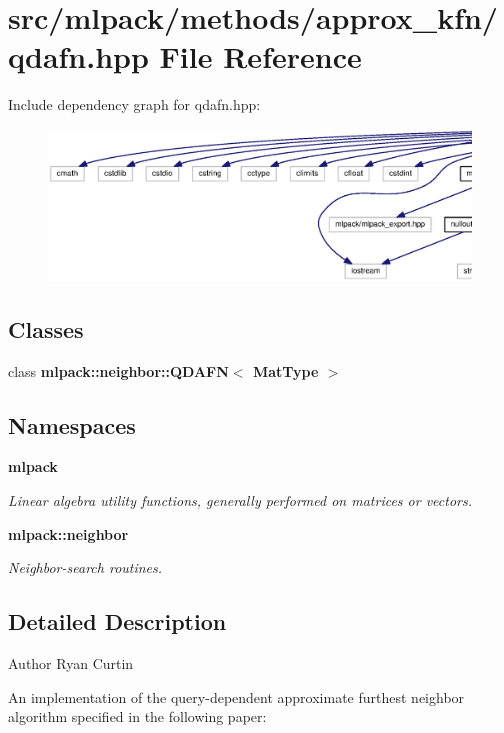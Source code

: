 \section{src/mlpack/methods/approx\+\_\+kfn/qdafn.hpp File Reference}
\label{qdafn_8hpp}
Include dependency graph for qdafn.\+hpp\+:
\nopagebreak
\begin{figure}[H]
\begin{center}
\leavevmode
\includegraphics[width=350pt]{qdafn_8hpp__incl}
\end{center}
\end{figure}
\subsection*{Classes}
\begin{DoxyCompactItemize}
\item 
class {\bf mlpack\+::neighbor\+::\+Q\+D\+A\+F\+N$<$ Mat\+Type $>$}
\end{DoxyCompactItemize}
\subsection*{Namespaces}
\begin{DoxyCompactItemize}
\item 
 {\bf mlpack}
\begin{DoxyCompactList}\small\item\em Linear algebra utility functions, generally performed on matrices or vectors. \end{DoxyCompactList}\item 
 {\bf mlpack\+::neighbor}
\begin{DoxyCompactList}\small\item\em Neighbor-\/search routines. \end{DoxyCompactList}\end{DoxyCompactItemize}


\subsection{Detailed Description}
\begin{DoxyAuthor}{Author}
Ryan Curtin
\end{DoxyAuthor}
An implementation of the query-\/dependent approximate furthest neighbor algorithm specified in the following paper\+:


